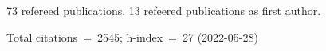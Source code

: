 73 refereed publications. 13 refeered publications as first author.

Total citations~=~2545; h-index~=~27 (2022-05-28)